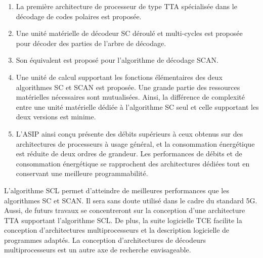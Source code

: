\begin{enumerate}[label=(\roman*)]
  \item La première architecture de processeur de type TTA spécialisée dans le décodage de codes polaires est proposée.
  \item Une unité matérielle de décodeur SC déroulé et multi-cycles est proposée pour décoder des parties de l'arbre de décodage.
  \item Son équivalent est proposé pour l'algorithme de décodage SCAN.
  \item Une unité de calcul supportant les fonctions élémentaires des deux algorithmes SC et SCAN est proposée. Une grande partie des ressources matérielles nécessaires sont mutualisées. Ainsi, la différence de complexité entre une unité matérielle dédiée à l'algorithme SC seul et celle supportant les deux versions est minime.
  \item L'ASIP ainsi conçu présente des débits supérieurs à ceux obtenus sur des architectures de processeurs à usage général, et la consommation énergétique est réduite de deux ordres de grandeur. Les performances de débits et de consommation énergétique se rapprochent des architectures dédiées tout en conservant une meilleure programmabilité.
\end{enumerate}

L'algorithme SCL permet d'atteindre de meilleures performances que les algorithmes SC et SCAN. Il sera sans doute utilisé dans le cadre du standard 5G. Aussi, de futurs travaux se concentreront sur la conception d'une architecture TTA supportant l'algorithme SCL. De plus, la suite logicielle TCE facilite la conception d'architectures multiprocesseurs et la description logicielle de programmes adaptés. La conception d'architectures de décodeurs multiprocesseurs est un autre axe de recherche envisageable.


